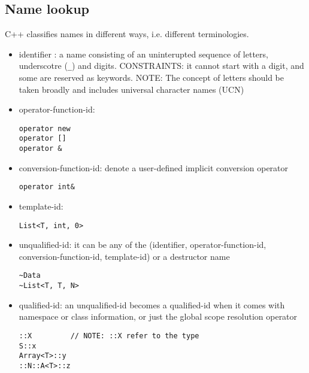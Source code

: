 \subsection{Name lookup}

C++ classifies names in different ways, i.e. different terminologies. 

\begin{itemize}
  \item identifier : a name consisting of an uninterupted sequence of letters,
  underscotre (\verb!_!) and digits. CONSTRAINTS: it cannot start with a digit,
  and some are reserved as keywords. NOTE: The concept of letters should be
  taken broadly and includes universal character names (UCN)
  
  \item operator-function-id: 
\begin{verbatim}
operator new
operator []
operator &
\end{verbatim}

   \item conversion-function-id: denote a user-defined implicit conversion
   operator
\begin{verbatim}
operator int&
\end{verbatim}

   \item template-id: 
\begin{verbatim}
List<T, int, 0>
\end{verbatim}

   \item unqualified-id: it can be any of the (identifier,
   operator-function-id, conversion-function-id, template-id) or a destructor
   name 
\begin{verbatim}
~Data
~List<T, T, N>
\end{verbatim}

   \item qualified-id: an unqualified-id becomes a qualified-id when it comes
   with namespace or class information, or just the global scope resolution
   operator
\begin{verbatim}
::X			// NOTE: ::X refer to the type
S::x
Array<T>::y
::N::A<T>::z
\end{verbatim}
\end{itemize}

